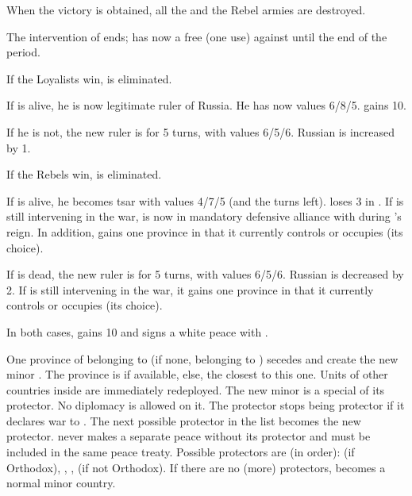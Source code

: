 \bparag When the victory is obtained, all the \REVOLT and the Rebel armies are
destroyed.

\bparag The intervention of \SUE ends; \RUS has now a free \CB (one use)
against \SUE until the end of the period.

\aparag If the Loyalists win, \leaderDmitry is eliminated.

\bparag If  is alive, he is now legitimate ruler of
Russia. He has now values 6/8/5.  \RUS gains 10\PV.

\bparag If he is not, the new ruler is \monarqueRomanov for 5 turns, with
values 6/5/6. Russian \STAB is increased by 1.

\aparag If the Rebels win,  is eliminated.

\bparag If \leaderDmitry is alive, he becomes tsar \monarqueDimitri with
values 4/7/5 (and the turns left). \RUS loses 3 in \STAB.  If \POL is still
intervening in the war, \RUS is now in mandatory defensive alliance with \POL
during \monarqueDimitri's reign. In addition, \POL gains one province in \RUS
that it currently controls or occupies (its choice).

\bparag If \leaderDmitry is dead, the new ruler is \monarqueRomanov for 5
turns, with values 6/5/6. Russian \STAB is decreased by 2.  If \POL is still
intervening in the war, it gains one province in \RUS that it currently
controls or occupies (its choice).

\bparag In both cases, \POL gains 10 \PV and signs a white peace with \RUS.







\phevnt
\aparag One province of \paysukraine belonging to \POL (if none, belonging to
\HAB) secedes and create the new minor \paysukraine. The province is
\provincePoltava if available, else, the closest to this one. Units of other
countries inside are immediately redeployed.
\aparag The new minor is a special \VASSAL of its protector. No diplomacy is
allowed on it.
\bparag The protector stops being protector if it declares war to
\paysukraine. The next possible protector in the list becomes the new
protector.
\aparag \paysukraine never makes a separate peace without its protector and
must be included in the same peace treaty.
\aparag Possible protectors are (in order): \POL (if Orthodox), \RUS, \TUR,
\POL (if not Orthodox). If there are no (more) protectors, \paysukraine
becomes a normal minor country.

